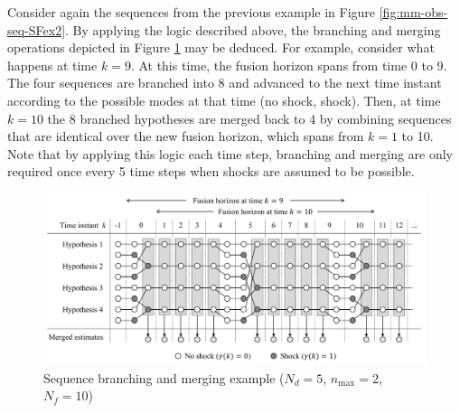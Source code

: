 Consider again the sequences from the previous example in Figure \ref{fig:mm-obs-seq-SFex2}. By applying the logic described above, the branching and merging operations depicted in Figure \ref{fig:mm-obs-seq-sf95} may be deduced. For example, consider what happens at time $k=9$. At this time, the fusion horizon spans from time 0 to 9. The four sequences are branched into 8 and advanced to the next time instant according to the possible modes at that time (no shock, shock). Then, at time $k=10$ the 8 branched hypotheses are merged back to 4 by combining sequences that are identical over the new fusion horizon, which spans from $k=1$ to 10. Note that by applying this logic each time step, branching and merging are only required once every 5 time steps when shocks are assumed to be possible.
\begin{figure}[htp]
	\centering
	\includegraphics[width=15cm]{images/mm_obs_seq_sf95.pdf}
	\caption{Sequence branching and merging example ($N_d=5$, $n_\text{max}=2$, $N_f=10$)}
	\label{fig:mm-obs-seq-sf95}
\end{figure}

